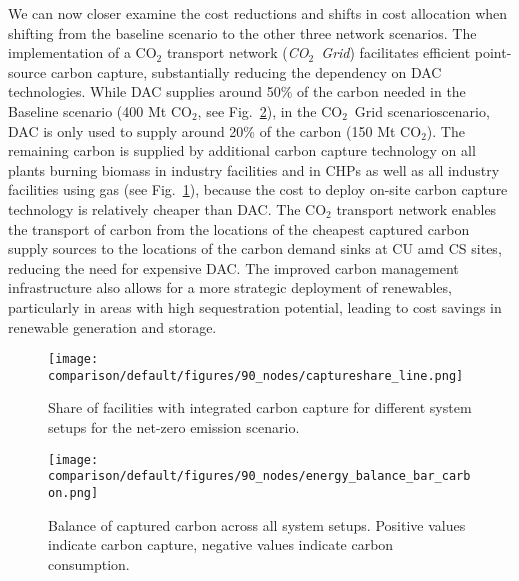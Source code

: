 \documentclass[twocolumn]{article}
\newcommand{\carbon}{CO$_2$}
\newcommand{\scCO}{CO$_2$~Grid scenario}
\begin{document}
We can now closer examine the cost reductions and shifts in cost allocation when shifting from the baseline scenario to the other three network scenarios.
The implementation of a \carbon{} transport network (\textit{\carbon{}~Grid}) facilitates efficient point-source carbon capture, substantially reducing the dependency on DAC technologies. While DAC supplies around 50\% of the carbon needed in the Baseline scenario (400 Mt \carbon{}, see Fig.~\ref{fig:balance_captured_carbon}), in the \scCO scenario, DAC is only used to supply around 20\% of the carbon (150 Mt \carbon{}). The remaining carbon is supplied by additional carbon capture technology on all plants burning biomass in industry facilities and in CHPs as well as all industry facilities using gas (see Fig.~\ref{fig:captureshare_line}), because the cost to deploy on-site carbon capture technology is relatively cheaper than DAC. The \carbon{} transport network enables the transport of carbon from the locations of the cheapest captured carbon supply sources to the locations of the carbon demand sinks at CU amd CS sites, reducing the need for expensive DAC. The improved carbon management infrastructure also allows for a more strategic deployment of renewables, particularly in areas with high sequestration potential, leading to cost savings in renewable generation and storage.


\begin{figure}[h]
    \centering
    \texttt{[image: comparison/default/figures/90\_nodes/captureshare\_line.png]}
    \caption{Share of facilities with integrated carbon capture for different system setups for the net-zero emission scenario.}
    \label{fig:captureshare_line}
\end{figure}


\begin{figure}[h]
    \centering
    \texttt{[image: comparison/default/figures/90\_nodes/energy\_balance\_bar\_carbon.png]}
    \caption{Balance of captured carbon across all system setups. Positive values indicate carbon capture, negative values indicate carbon consumption.}
    \label{fig:balance_captured_carbon}
\end{figure}
\end{document}
